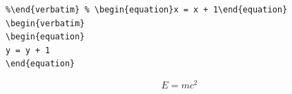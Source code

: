 \begin{verbatim}%\end{verbatim} %
\begin{verbatim}
\begin{equation}
y = y + 1
\end{equation}
\end{verbatim}
\begin{equation}
E = m c^2
\end{equation}
